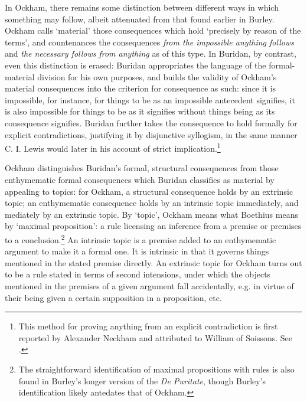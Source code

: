 In Ockham, there remains some distinction between different ways in which something may follow, albeit attenuated from that found earlier in Burley. Ockham calls `material' those consequences which hold `precisely by reason of the terms', and countenances the consequences \textit{from the impossible anything follows} and \textit{the necessary follows from anything} as of this type. In Buridan, by contrast, even this distinction is erased: Buridan appropriates the language of the formal-material division for his own purposes, and builds the validity of Ockham's material consequences into the criterion for consequence as such: since it is impossible, for instance, for things to be as an impossible antecedent signifies, it is also impossible for things to be as it signifies without things being as its consequence signifies. Buridan further takes the consequence to hold formally for explicit contradictions, justifying it by disjunctive syllogism, in the same manner C. I. Lewis would later in his account of strict implication.\footnote{This method for proving anything from an explicit contradiction is first reported by Alexander Neckham and attributed to William of Soissons. See \cite{Martin2012}.} 

Ockham distinguishes Buridan's formal, structural consequences from those enthymematic formal consequences which Buridan classifies as material by appealing to topics: for Ockham, a structural consequence holds by an extrinsic topic; an enthymematic consequence holds by an intrinsic topic immediately, and mediately by an extrinsic topic. By `topic', Ockham means what Boethius means by `maximal proposition': a rule licensing an inference from a premise or premises to a conclusion.\footnote{The straightforward identification of maximal propositions with rules is also found in Burley's longer version of the \textit{De Puritate}, though Burley's identification likely antedates that of Ockham.} An intrinsic topic is a premise added to an enthymematic argument to make it a formal one. It is intrinsic in that it governs things mentioned in the stated premise directly. An extrinsic topic for Ockham turns out to be a rule stated in terms of second intensions, under which the objects mentioned in the premises of a given argument fall accidentally, e.g. in virtue of their being given a certain supposition in a proposition, etc. 

